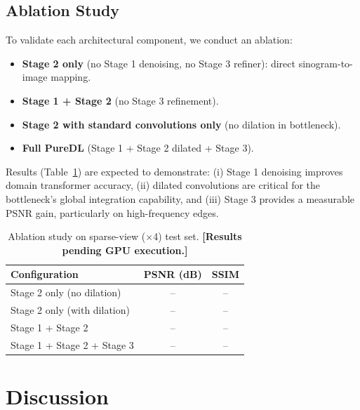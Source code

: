 \documentclass[10pt,twocolumn]{article}
\begin{document}
\subsection{Ablation Study}

To validate each architectural component, we conduct an ablation:
\begin{itemize}[leftmargin=*, noitemsep]
    \item \textbf{Stage 2 only} (no Stage 1 denoising, no Stage 3 refiner):
    direct sinogram-to-image mapping.
    \item \textbf{Stage 1 + Stage 2} (no Stage 3 refinement).
    \item \textbf{Stage 2 with standard convolutions only} (no dilation
    in bottleneck).
    \item \textbf{Full PureDL} (Stage 1 + Stage 2 dilated + Stage 3).
\end{itemize}
Results (Table~\ref{tab:ablation}) are expected to demonstrate:
(i) Stage 1 denoising improves domain transformer accuracy,
(ii) dilated convolutions are critical for the bottleneck's global
integration capability, and
(iii) Stage 3 provides a measurable PSNR gain, particularly on
high-frequency edges.

\begin{table}[H]
    \centering
    \caption{Ablation study on sparse-view ($\times$4) test set.
    \textbf{[Results pending GPU execution.]}}
    \label{tab:ablation}
    \begin{tabular}{lcc}
        \toprule
        \textbf{Configuration} & PSNR (dB) & SSIM \\
        \midrule
        Stage 2 only (no dilation)       & -- & -- \\
        Stage 2 only (with dilation)     & -- & -- \\
        Stage 1 + Stage 2                & -- & -- \\
        Stage 1 + Stage 2 + Stage 3      & -- & -- \\
        \bottomrule
    \end{tabular}
\end{table}

\section{Discussion}
\label{sec:discussion}
\end{document}
